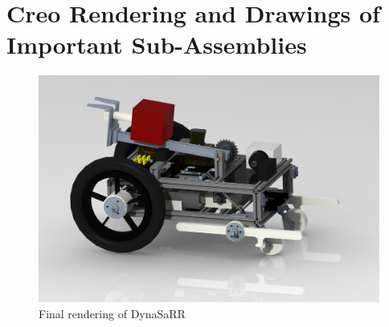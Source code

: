 \section{Creo Rendering and Drawings of Important Sub-Assemblies}

\begin{figure}[ht]
    \centering
    \includegraphics[width=0.7\columnwidth]{./Images/FDR_pretty_picture_2}
    \caption{Final rendering of DynaSaRR}
\end{figure}

\begin{landscape}



\end{landscape}